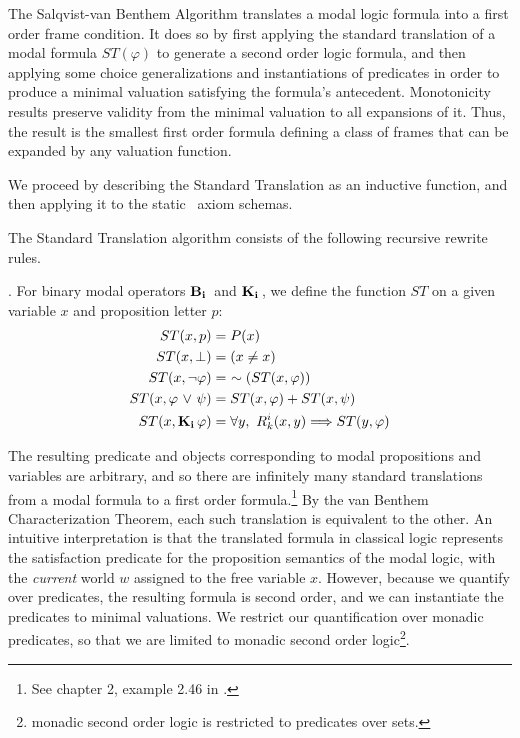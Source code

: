 The Salqvist-van Benthem Algorithm translates a modal logic formula into a first order frame condition. It does so by first applying the standard translation of a modal formula $ST(\varphi)$ to generate a second order logic formula, and then applying some choice generalizations and instantiations of predicates in order to produce a minimal valuation satisfying the formula's antecedent. Monotonicity results preserve validity from the minimal valuation to all expansions of it. Thus, the result is the smallest first order formula defining a class of frames that can be expanded by any valuation function.

We proceed by describing the Standard Translation as an inductive function, and then applying it to the static \DASL\ axiom schemas.

The Standard Translation algorithm consists of the following recursive rewrite rules.

\begin{definition}. For binary modal operators $\mathbf{B}_{\mathbf{i}}\,$ and $\mathbf{K}_{\mathbf{i}}\,$, we define the function $ST$ on a given variable $x$ and proposition letter $p$:
	\begin{align*}
	ST(x, p) &= P(x) \\
	ST(x, \bot) &= (x \neq x) \\
	ST(x, {\neg}\varphi) &=\ \sim(ST(x, \varphi)) \\
	ST(x, \varphi {\ \vee \ } \psi) &= ST(x, \varphi) + ST(x, \psi)\\
	ST(x, \mathbf{K}_{\mathbf{i}}\,\varphi) &= \forall y,\ R_{k}^i(x,y) \Longrightarrow ST(y, \varphi) \\
	\end{align*}	
\end{definition}
The resulting predicate and objects corresponding to modal propositions and variables are arbitrary, and so there are infinitely many standard translations from a modal formula to a first order formula.\footnote{See chapter 2, example 2.46 in \cite{modal}.} By the van Benthem Characterization Theorem, each such translation is equivalent to the other. An intuitive interpretation is that the translated formula in classical logic represents the satisfaction predicate for the proposition semantics of the modal logic, with the \emph{current} world $w$ assigned to the free variable $x$. However, because we quantify over predicates, the resulting formula is second order, and we can instantiate the predicates to minimal valuations. We restrict our quantification over monadic predicates, so that we are limited to monadic second order logic\footnote{monadic second order logic is restricted to predicates over sets.}.

